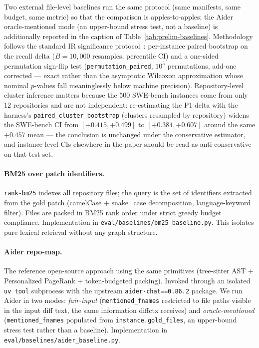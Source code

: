 \documentclass[11pt, a4paper]{article}
\begin{document}
Two external file-level baselines run the same protocol (same manifests, same budget, same metric) so that the comparison is apples-to-apples; the Aider oracle-mentioned mode (an upper-bound stress test, not a baseline) is additionally reported in the caption of Table~\ref{tab:prelim-baselines}. Methodology follows the standard IR significance protocol~\cite{smucker2007comparison}: per-instance paired bootstrap on the recall delta ($B{=}10{,}000$ resamples, percentile CI) and a one-sided permutation sign-flip test (\texttt{permutation\_paired}, $10^5$ permutations, add-one corrected --- exact rather than the asymptotic Wilcoxon approximation whose nominal $p$-values fall meaninglessly below machine precision). Repository-level cluster inference matters because the 500 SWE-bench instances come from only 12 repositories and are not independent: re-estimating the P1 delta with the harness's \texttt{paired\_cluster\_bootstrap} (clusters resampled by repository) widens the SWE-bench CI from $[+0.415, +0.499]$ to $[+0.384, +0.607]$ around the same $+0.457$ mean --- the conclusion is unchanged under the conservative estimator, and instance-level CIs elsewhere in the paper should be read as anti-conservative on that test set.

\paragraph{BM25 over patch identifiers.} \texttt{rank-bm25} indexes all repository files; the query is the set of identifiers extracted from the gold patch (camelCase + snake\_case decomposition, language-keyword filter). Files are packed in BM25 rank order under strict greedy budget compliance. Implementation in \texttt{eval/baselines/bm25\_baseline.py}. This isolates pure lexical retrieval without any graph structure.

\paragraph{Aider repo-map.} The reference open-source approach using the same primitives (tree-sitter AST + Personalized PageRank + token-budgeted packing). Invoked through an isolated \texttt{uv tool} subprocess with the upstream \texttt{aider-chat==0.86.2} package. We run Aider in two modes: \emph{fair-input} (\texttt{mentioned\_fnames} restricted to file paths visible in the input diff text, the same information diffctx receives) and \emph{oracle-mentioned} (\texttt{mentioned\_fnames} populated from \texttt{instance.gold\_files}, an upper-bound stress test rather than a baseline). Implementation in \texttt{eval/baselines/aider\_baseline.py}.
\end{document}
